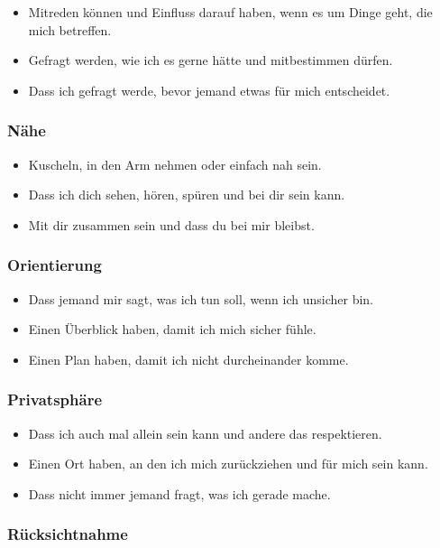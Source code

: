 \begin{itemize}
  \item Mitreden können und Einfluss darauf haben, wenn es um Dinge geht, die mich betreffen.
  \item Gefragt werden, wie ich es gerne hätte und mitbestimmen dürfen.
  \item Dass ich gefragt werde, bevor jemand etwas für mich entscheidet.
\end{itemize}


\subsubsection{Nähe}

\begin{itemize}
  \item Kuscheln, in den Arm nehmen oder einfach nah sein.
  \item Dass ich dich sehen, hören, spüren und bei dir sein kann.
  \item Mit dir zusammen sein und dass du bei mir bleibst.
\end{itemize}


\subsubsection{Orientierung}

\begin{itemize}
  \item Dass jemand mir sagt, was ich tun soll, wenn ich unsicher bin.
  \item Einen Überblick haben, damit ich mich sicher fühle.
  \item Einen Plan haben, damit ich nicht durcheinander komme.
\end{itemize}


\subsubsection{Privatsphäre}

\begin{itemize}
  \item Dass ich auch mal allein sein kann und andere das respektieren.
  \item Einen Ort haben, an den ich mich zurückziehen und für mich sein kann.
  \item Dass nicht immer jemand fragt, was ich gerade mache.
\end{itemize}


\subsubsection{Rücksichtnahme}

